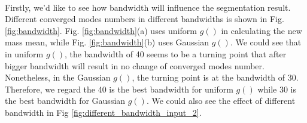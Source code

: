 \documentclass{gapd}
\begin{document}
\paragraph{}
	Firstly, we'd like to see how bandwidth will influence the segmentation result. Different converged modes numbers in different bandwidths is shown in Fig. \ref{fig:bandwidth}. Fig. \ref{fig:bandwidth}(a) uses uniform $g()$ in calculating the new mass mean, while Fig. \ref{fig:bandwidth}(b) uses Gaussian $g()$. We could see that in uniform $g()$, the bandwidth of 40 seems to be a turning point that after bigger bandwidth will result in no change of converged modes number. Nonetheless, in the Gaussian $g()$, the turning point is at the bandwidth of 30. Therefore, we regard the 40 is the best bandwidth for uniform $g()$ while 30 is the best bandwidth for Gaussian $g()$. We could also see the effect of different bandwidth in Fig \ref{fig:different_bandwidth_input_2}. 
	
\end{document}
